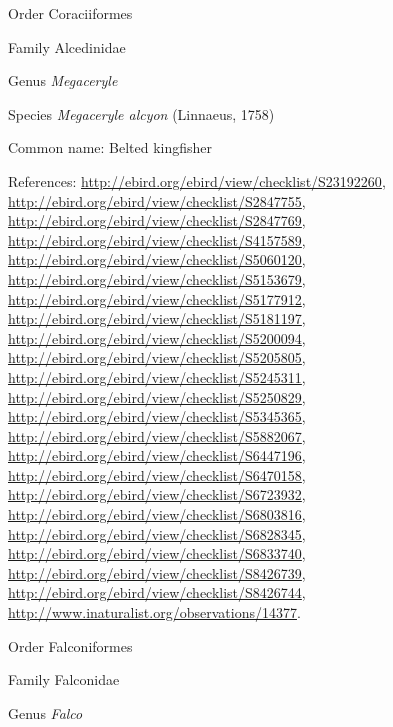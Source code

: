 \documentclass[9pt, article]{memoir}
\begin{document}
\begin{multicols}{2}
\vspace{6pt}\noindent\hspace{18pt}Order Coraciiformes


\vspace{6pt}\noindent\hspace{24pt}Family Alcedinidae


\vspace{6pt}\noindent\hspace{30pt}Genus \textit{Megaceryle}


\vspace{6pt}\noindent\hspace{36pt}Species \textit{Megaceryle alcyon} (Linnaeus, 1758)


Common name: Belted kingfisher

References: 
\url{http://ebird.org/ebird/view/checklist/S23192260}, 
\url{http://ebird.org/ebird/view/checklist/S2847755}, 
\url{http://ebird.org/ebird/view/checklist/S2847769}, 
\url{http://ebird.org/ebird/view/checklist/S4157589}, 
\url{http://ebird.org/ebird/view/checklist/S5060120}, 
\url{http://ebird.org/ebird/view/checklist/S5153679}, 
\url{http://ebird.org/ebird/view/checklist/S5177912}, 
\url{http://ebird.org/ebird/view/checklist/S5181197}, 
\url{http://ebird.org/ebird/view/checklist/S5200094}, 
\url{http://ebird.org/ebird/view/checklist/S5205805}, 
\url{http://ebird.org/ebird/view/checklist/S5245311}, 
\url{http://ebird.org/ebird/view/checklist/S5250829}, 
\url{http://ebird.org/ebird/view/checklist/S5345365}, 
\url{http://ebird.org/ebird/view/checklist/S5882067}, 
\url{http://ebird.org/ebird/view/checklist/S6447196}, 
\url{http://ebird.org/ebird/view/checklist/S6470158}, 
\url{http://ebird.org/ebird/view/checklist/S6723932}, 
\url{http://ebird.org/ebird/view/checklist/S6803816}, 
\url{http://ebird.org/ebird/view/checklist/S6828345}, 
\url{http://ebird.org/ebird/view/checklist/S6833740}, 
\url{http://ebird.org/ebird/view/checklist/S8426739}, 
\url{http://ebird.org/ebird/view/checklist/S8426744}, 
\url{http://www.inaturalist.org/observations/14377}.

\vspace{6pt}\noindent\hspace{18pt}Order Falconiformes


\vspace{6pt}\noindent\hspace{24pt}Family Falconidae


\vspace{6pt}\noindent\hspace{30pt}Genus \textit{Falco}



\end{multicols}
\end{document}
